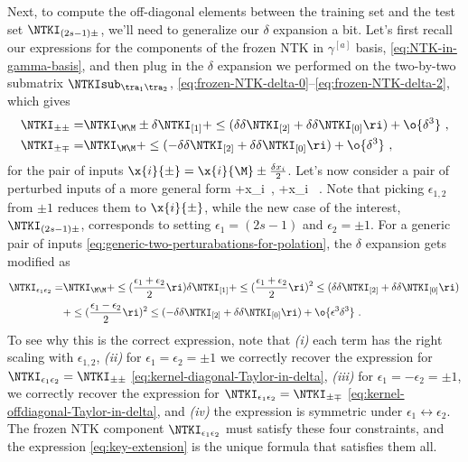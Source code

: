 Next, to compute the off-diagonal elements between the training set and the test set $\NTKI_{(2s-1) \pm}$, we'll need to generalize our $\delta$ expansion a bit.
Let's first recall our expressions for the components of the frozen NTK in $\gamma^{[a]}$ basis, \eqref{eq:NTK-in-gamma-basis}, and then plug in the $\delta$ expansion we performed on the two-by-two submatrix $\NTKIsub_{\tra_1\tra_2}$, \eqref{eq:frozen-NTK-delta-0}--\eqref{eq:frozen-NTK-delta-2}, which gives
\begin{align}
\NTKI_{\pm\pm}=&\NTKI_{\M\M}\pm \delta\NTKI_{[1]}+ \le(\delta\delta\NTKI_{[2]}+\delta\delta\NTKI_{[0]}\ri)+\o{\delta^3}\ ,\label{eq:kernel-diagonal-Taylor-in-delta}\\
\NTKI_{\pm\mp}=&\NTKI_{\M\M}+ \le(-\delta\delta\NTKI_{[2]}+\delta\delta\NTKI_{[0]}\ri)+\o{\delta^3}\ ,\label{eq:kernel-offdiagonal-Taylor-in-delta}
\end{align}
for the pair of inputs $\x{i}{\pm}=\x{i}{\M}\pm \frac{\delta x_i}{2}$. Let's now consider a pair of perturbed inputs of a more general form
\be\label{eq:generic-two-perturabations-for-polation}
\equiv{}+\delta x_{i}\, , \qquad {}\equiv{}+\delta x_{i} \, .
\ee 
Note that picking $\epsilon_{1,2}$ from $\pm1$ reduces them to $\x{i}{\pm}$,
while the new case of the interest, $\NTKI_{(2s-1) \pm}$, corresponds to setting $\epsilon_1=(2s-1)$ and $\epsilon_2=\pm1$.
For a generic pair of inputs \eqref{eq:generic-two-perturabations-for-polation}, the $\delta$ expansion gets modified as
\begin{align}\label{eq:key-extension}
\NTKI_{\epsilon_1\epsilon_2}=&\NTKI_{\M\M}+\le(\frac{\epsilon_1+\epsilon_2}{2}\ri) \delta\NTKI_{[1]}+\le(\frac{\epsilon_1+\epsilon_2}{2}\ri)^2 \le(\delta\delta\NTKI_{[2]}+\delta\delta\NTKI_{[0]}\ri)\, \\
&+\le(\frac{\epsilon_1-\epsilon_2}{2}\ri)^2 \le(-\delta\delta\NTKI_{[2]}+\delta\delta\NTKI_{[0]}\ri)+\o{\epsilon^3\delta^3}\ .\notag
\end{align}
To see why this is the correct expression, note that \emph{(i)} each term has the right scaling with $\epsilon_{1,2}$, \emph{(ii)} for $\epsilon_1=\epsilon_2=\pm1$ we correctly recover the expression for $\NTKI_{\epsilon_1\epsilon_2}=\NTKI_{\pm\pm}$ \eqref{eq:kernel-diagonal-Taylor-in-delta}, \emph{(iii)} for $\epsilon_1=-\epsilon_2=\pm1$, we correctly recover the expression for $\NTKI_{\epsilon_1\epsilon_2}=\NTKI_{\pm\mp}$ \eqref{eq:kernel-offdiagonal-Taylor-in-delta}, and \emph{(iv)} the expression is symmetric under $\epsilon_1\leftrightarrow\epsilon_2$. The frozen NTK component $\NTKI_{\epsilon_1\epsilon_2}$ must satisfy these four constraints, and the expression \eqref{eq:key-extension} is the unique formula that satisfies them all.


